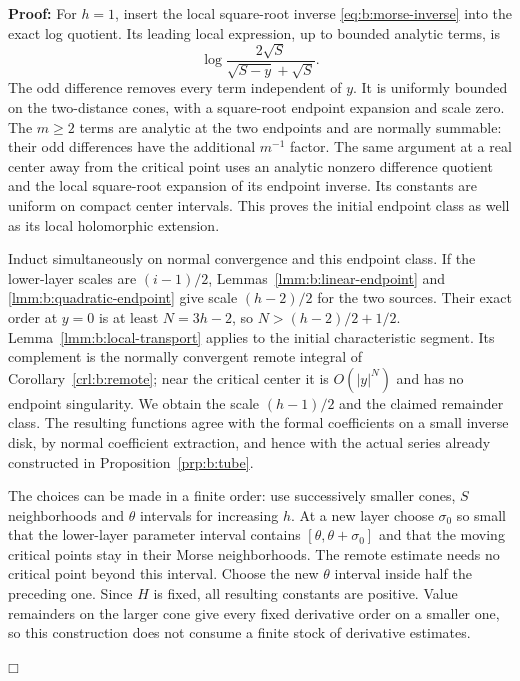 \documentclass[a4paper,10pt]{article}
\numberwithin{equation}{section}
\theoremstyle{paperplain}
\theoremstyle{paperremark}
\theoremstyle{paperplain}
\newenvironment{prf}{\noindent \textbf{Proof: }}{\hfill $\mdlgwhtsquare$\par\addvspace{0.5\baselineskip}}
\begin{document}
\begin{prf}
For $h=1$, insert the local square-root inverse
\eqref{eq:b:morse-inverse} into the exact log quotient. Its leading
local expression, up to bounded analytic terms, is
\[
 \log\frac{2\sqrt S}{\sqrt{S-y}+\sqrt S}.
\]
The odd difference removes every term independent of $y$.
It is uniformly bounded on the two-distance cones, with a
square-root endpoint expansion and scale zero. The $m\geq2$
terms are analytic at the two endpoints and are normally summable:
their odd differences have the additional $m^{-1}$ factor.
The same argument at a real center away from the critical point
uses an analytic nonzero difference quotient and the local
square-root expansion of its endpoint inverse. Its constants are
uniform on compact center intervals. This proves the initial
endpoint class as well as its local holomorphic extension.

Induct simultaneously on normal convergence and this endpoint class.
If the lower-layer scales are $(i-1)/2$,
Lemmas~\ref{lmm:b:linear-endpoint} and
\ref{lmm:b:quadratic-endpoint} give scale $(h-2)/2$ for the two
sources. Their exact order at $y=0$ is at least $N=3h-2$, so
$N>(h-2)/2+1/2$. Lemma~\ref{lmm:b:local-transport} applies to
the initial characteristic segment. Its complement is the normally
convergent remote integral of Corollary~\ref{crl:b:remote}; near
the critical center it is $O(|y|^N)$ and has no endpoint singularity.
We obtain the scale $(h-1)/2$ and the claimed remainder class.
The resulting functions agree with the formal coefficients on a
small inverse disk, by normal coefficient extraction, and hence
with the actual series already constructed in
Proposition~\ref{prp:b:tube}.

The choices can be made in a finite order: use successively smaller
cones, $S$ neighborhoods and $\theta$ intervals for increasing $h$.
At a new layer choose $\sigma_0$ so small that the lower-layer
parameter interval contains $[\theta,\theta+\sigma_0]$ and that
the moving critical points stay in their Morse neighborhoods.
The remote estimate needs no critical point beyond this interval.
Choose the new $\theta$ interval inside half the preceding one.
Since $H$ is fixed, all resulting constants are positive.
Value remainders on the larger cone give every fixed derivative
order on a smaller one, so this construction does not consume a
finite stock of derivative estimates.


\end{prf}
\end{document}
